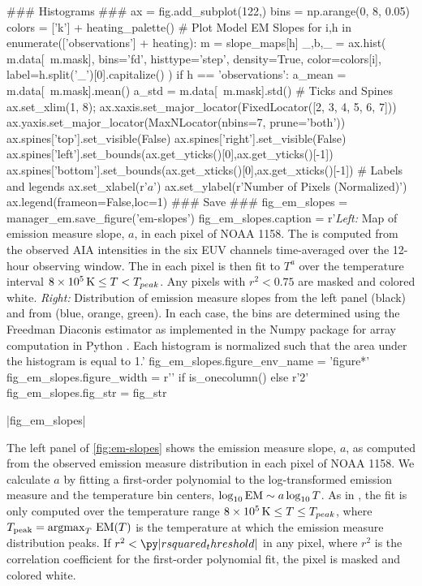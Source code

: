 \begin{pycode}[manager_em]
### Histograms ###
ax = fig.add_subplot(122,)
bins = np.arange(0, 8, 0.05)
colors = ['k'] + heating_palette()
# Plot Model EM Slopes
for i,h in enumerate(['observations'] + heating):
    m = slope_maps[h]
    _,b,_ = ax.hist(
        m.data[~m.mask],
        bins='fd',
        histtype='step',
        density=True,
        color=colors[i],
        label=h.split('_')[0].capitalize()
    )
    if h == 'observations':
        a_mean = m.data[~m.mask].mean()
        a_std = m.data[~m.mask].std()
# Ticks and Spines
ax.set_xlim(1, 8);
ax.xaxis.set_major_locator(FixedLocator([2, 3, 4, 5, 6, 7]))
ax.yaxis.set_major_locator(MaxNLocator(nbins=7, prune='both'))
ax.spines['top'].set_visible(False)
ax.spines['right'].set_visible(False)
ax.spines['left'].set_bounds(ax.get_yticks()[0],ax.get_yticks()[-1])
ax.spines['bottom'].set_bounds(ax.get_xticks()[0],ax.get_xticks()[-1])
# Labels and legends
ax.set_xlabel(r'$a$')
ax.set_ylabel(r'Number of Pixels (Normalized)')
ax.legend(frameon=False,loc=1)
### Save ###
fig_em_slopes = manager_em.save_figure('em-slopes')
fig_em_slopes.caption = r'\textit{Left:} Map of emission measure slope, $a$, in each pixel of \AR{} NOAA 1158. The \dem{} is computed from the observed AIA intensities in the six EUV channels time-averaged over the 12-hour observing window. The \dem{} in each pixel is then fit to $T^a$ over the temperature interval $8\times10^5\,\textup{K}\le T < T_{peak}$. Any pixels with $r^2<0.75$ are masked and colored white. \textit{Right:} Distribution of emission measure slopes from the left panel (black) and from  (blue, orange, green). In each case, the bins are determined using the Freedman Diaconis estimator \citep{freedman_histogram_1981} as implemented in the Numpy package for array computation in Python \citep{oliphant_guide_2006}. Each histogram is normalized such that the area under the histogram is equal to 1.'
fig_em_slopes.figure_env_name = 'figure*'
fig_em_slopes.figure_width = r'\columnwidth' if is_onecolumn() else r'2\columnwidth'
fig_em_slopes.fig_str = fig_str
\end{pycode}
\py[manager_em]|fig_em_slopes|

The left panel of \autoref{fig:em-slopes} shows the emission measure slope, $a$, as computed from the observed emission measure distribution in each pixel of \AR{} NOAA 1158. We calculate $a$ by fitting a first-order polynomial to the log-transformed emission measure and the temperature bin centers, $\log_{10}\textup{EM}\sim a\log_{10}T$. As in , the fit is only computed over the temperature range $8\times10^5\,\textup{K}\le T \le T_{peak}$, where $T_\textup{peak}=\operatorname*{argmax}_T\,\textup{EM}(T)$ is the temperature at which the emission measure distribution peaks. If $r^2<\py|rsquared_threshold|$ in any pixel, where $r^2$ is the correlation coefficient for the first-order polynomial fit, the pixel is masked and colored white. 

